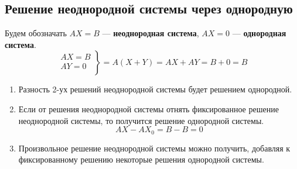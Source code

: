 \documentclass[a4paper, 12pt]{article}
\begin{document}
\subsection*{Решение неоднородной системы через однородную}
Будем обозначать $AX=B$ --- \textbf{неоднородная система}, $AX=0$ --- \textbf{однородная система}.
$$\left.
  \begin{array}{ccc}
    AX=B \\
    AY=0 \\
  \end{array}
\right\}=A(X+Y)=AX+AY=B+0=B$$
\begin{enumerate}
    \item Разность 2-ух решений неоднородной системы будет решением однородной.
    \item Если от решения неоднородной системы отнять фиксированное решение неоднородной системы, то получится решение однородной системы.
    $$AX-AX_0=B-B=0$$
    \item Произвольное решение неоднородной системы можно получить, добавляя к фиксированному решению некоторые решения однородной системы.
\end{enumerate}
\end{document}
